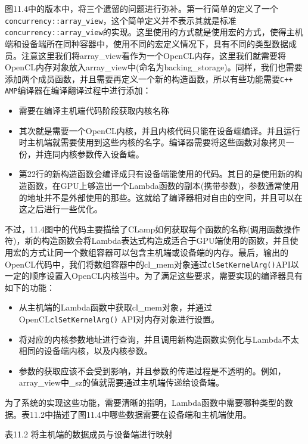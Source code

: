 图11.4中的版本中，将三个遗留的问题进行弥补。第一行简单的定义了一个\texttt{concurrency::array\_view}，这个简单定义并不表示其就是标准\texttt{concurrency::array\_view}的实现。这里使用的方式就是使用宏的方式，使得主机端和设备端所在同种容器中，使用不同的宏定义情况下，具有不同的类型数据成员。注意这里我们将array\_\allowbreak{}view看作为一个OpenCL内存，这里我们就需要将OpenCL内存对象放入array\_\allowbreak{}view中(命名为backing\_\allowbreak{}storage)。同样，我们也需要添加两个成员函数，并且需要再定义一个新的构造函数，所以有些功能需要\texttt{C++ AMP}编译器在编译翻译过程中进行添加：

\begin{itemize}
\item 需要在编译主机端代码阶段获取内核名称
\item 其次就是需要一个OpenCL内核，并且内核代码只能在设备端编译。并且运行时主机端就需要使用到这些内核的名字。编译器需要将这些函数对象拷贝一份，并连同内核参数传入设备端。
\item 第22行的新构造函数会编译成只有设备端能使用的代码。其目的是使用新的构造函数，在GPU上够造出一个Lambda函数的副本(携带参数)，参数通常使用的地址并不是外部使用的那些。这就给了编译器相对自由的空间，并且可以在这之后进行一些优化。
\end{itemize}

不过，11.4图中的代码主要描绘了CLamp如何获取每个函数的名称(调用函数操作符)，新的构造函数会将Lambda表达式构造成适合于GPU端使用的函数，并且使用宏的方式让同一个数组容器可以包含主机端或设备端的内存。最后，输出的OpenCL代码中，我们将数组容器中的cl\_\allowbreak{}mem对象通过\texttt{clSetKernelArg()}API以一定的顺序设置入OpenCL内核当中。为了满足这些要求，需要实现的编译器具有如下的功能：

\begin{itemize}
\item 从主机端的Lambda函数中获取cl\_\allowbreak{}mem对象，并通过OpenCL\texttt{clSetKernelArg()} API对内存对象进行设置。
\item 将对应的内核参数地址进行查询，并且调用新构造函数实例化与Lambda不太相同的设备端内核，以及内核参数。
\item 参数的获取应该不会受到影响，并且参数的传递过程是不透明的。例如，array\_\allowbreak{}view中\_\allowbreak{}sz的值就需要通过主机端传递给设备端。
\end{itemize}

为了系统的实现这些功能，需要清晰的指明，Lambda函数中需要哪种类型的数据。表11.2中描述了图11.4中哪些数据需要在设备端和主机端使用。

表11.2 将主机端的数据成员与设备端进行映射

